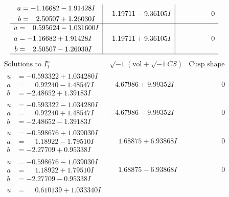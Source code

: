 \documentclass[1p]{elsarticle_modified}
\theoremstyle{definition}
\newcommand{\I}{\sqrt{-1}}
\begin{document}
$$\begin{array}{c|c|c}
\begin{aligned}
a &= -1.16682 - 1.91428 I \\
b &= \phantom{-}2.50507 + 1.26030 I\end{aligned}
 & \phantom{-}1.19711 - 9.36105 I & \phantom{-0.000000 } 0 \\ \hline\begin{aligned}
u &= \phantom{-}0.595624 - 1.031600 I \\
a &= -1.16682 + 1.91428 I \\
b &= \phantom{-}2.50507 - 1.26030 I\end{aligned}
 & \phantom{-}1.19711 + 9.36105 I & \phantom{-0.000000 } 0\\
 \hline 
 \end{array}$$\newpage$$\begin{array}{c|c|c}  
\text{Solutions to }I^u_{1}& \I (\text{vol} + \sqrt{-1}CS) & \text{Cusp shape}\\
 \hline 
\begin{aligned}
u &= -0.593322 + 1.034280 I \\
a &= \phantom{-}0.92240 - 1.48547 I \\
b &= -2.48652 + 1.39183 I\end{aligned}
 & -4.67986 + 9.99352 I & \phantom{-0.000000 } 0 \\ \hline\begin{aligned}
u &= -0.593322 - 1.034280 I \\
a &= \phantom{-}0.92240 + 1.48547 I \\
b &= -2.48652 - 1.39183 I\end{aligned}
 & -4.67986 - 9.99352 I & \phantom{-0.000000 } 0 \\ \hline\begin{aligned}
u &= -0.598676 + 1.039030 I \\
a &= \phantom{-}1.18922 - 1.79510 I \\
b &= -2.27709 + 0.95338 I\end{aligned}
 & \phantom{-}1.68875 + 6.93868 I & \phantom{-0.000000 } 0 \\ \hline\begin{aligned}
u &= -0.598676 - 1.039030 I \\
a &= \phantom{-}1.18922 + 1.79510 I \\
b &= -2.27709 - 0.95338 I\end{aligned}
 & \phantom{-}1.68875 - 6.93868 I & \phantom{-0.000000 } 0 \\ \hline\begin{aligned}
u &= \phantom{-}0.610139 + 1.033340 I \\

\end{aligned}
\end{array}$$
\end{document}
